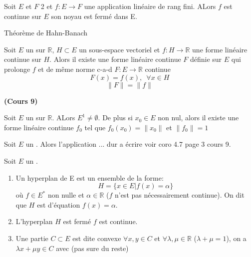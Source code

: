 \documentclass[12pt,a4paper]{article}
\begin{document}
\begin{flushleft}
\begin{thm}
Soit $E$ et $F$ 2 \evn et $f: E \longrightarrow F$ une application linéaire de rang fini. ALors $f$ est continue sur $E$ \ssi son noyau est fermé dans E.
\end{thm}

Théorème de Hahn-Banach
\begin{thm}
Soit $E$ un \evn sur $\mathbb{R}$, $H \subset E$ un sous-espace vectoriel et $f: H \longrightarrow \mathbb{R}$ une forme linéaire continue sur $H$. Alors il existe une forme linéaire continue $F$ définie sur $E$ qui prolonge $f$ et de même norme c-a-d $F: E \longrightarrow \mathbb{R}$ continue $$F(x) = f(x), \enspace \forall x \in H$$ $$\lVert F \rVert = \lVert f \rVert $$
\end{thm}


\textbf{(Cours 9)}



\begin{cor}
Soit $E$ un \evn sur $\mathbb{R}$. ALors $E^1 \neq \emptyset$. De plus si $x_0 \in E$ non nul, alors il existe une forme linéaire continue $f_0$ tel que $f_0 (x_0) = \lVert x_0 \rVert$ et $\lVert f_0 \rVert = 1$
\end{cor}

\begin{cor}
Soit $E$ un \evn . Alors l'application ... dur a écrire voir coro 4.7 page 3 cours 9.
\end{cor}

\begin{mydef}
Soit $E$ un \evn . 
\begin{enumerate}
\item Un hyperplan de E est un ensemble de la forme: $$ H = \{ x \in E | f(x) = \alpha \}$$ où $f \in E^*$ non nulle et $\alpha \in \mathbb{R}$ ($f$ n'est pas nécessairement continue). On dit que $H$ est d'équation $f(x) = \alpha$.
\item L'hyperplan $H$ est fermé \ssi $f$ est continue.
\item Une partie $C \subset E$ est dite convexe \ssi $\forall x, y \in C$ et $\forall \lambda , \mu \in \mathbb{R}$ ($\lambda + \mu = 1$), on a $\lambda x + \mu y \in C$ avec (pas sure du reste)
\end{enumerate}
\end{mydef}












































\end{flushleft}
\end{document}
